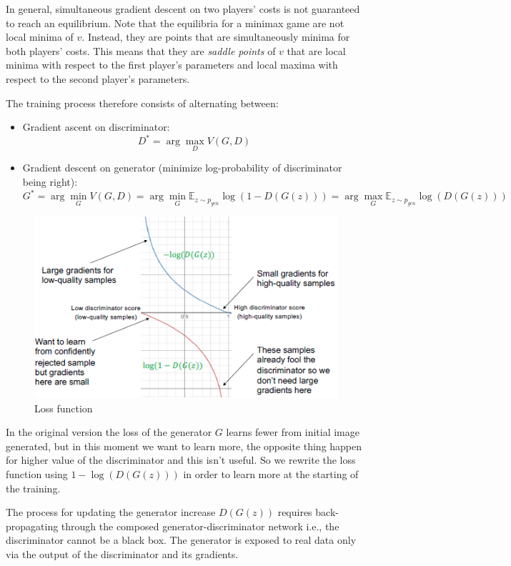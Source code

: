 In general, simultaneous gradient descent on two players' costs is not guaranteed
to reach an equilibrium. Note that the equilibria for a minimax game are not
local minima of $v$. Instead, they are points that are simultaneously minima for
both players' costs. This means that they are \textit{saddle points} of $v$ that
are local minima with respect to the first player's parameters and local maxima
with respect to the second player's parameters.

The training process therefore consists of alternating between:
\begin{itemize}
    \item Gradient ascent on discriminator:
          \begin{equation}
              D^\ast = \arg \max_D V(G,D)
          \end{equation}
    \item Gradient descent on generator (minimize log-probability of discriminator being right):
          \begin{equation}
              G^\ast = \arg \min_G V(G,D) = \arg \min_G \mathbb{E}_{z\sim p_{gen}} \log(1-D(G(z)))  =  \arg \max_G \mathbb{E}_{z\sim p_{gen}} \log(D(G(z)))
          \end{equation}
\end{itemize}

\begin{figure}[!ht]
    \centering
    \includegraphics[width=0.5\linewidth]{img/GAN/loss.png}
    \caption{Loss function}
    \label{fig:lossfunc}
\end{figure}

In the original version the loss of the generator $G$ learns fewer from initial
image generated, but in this moment we want to learn more, the opposite thing
happen for higher value of the discriminator and this isn't useful. So we rewrite
the loss function using  $1 - \log(D(G(z)))$ in order to learn more at the
starting of the training.

The process for updating the generator increase $D(G(z))$ requires back-propagating
through the composed generator-discriminator network i.e., the discriminator
cannot be a black box. The generator is exposed to real data only via the output
of the discriminator and its gradients.

